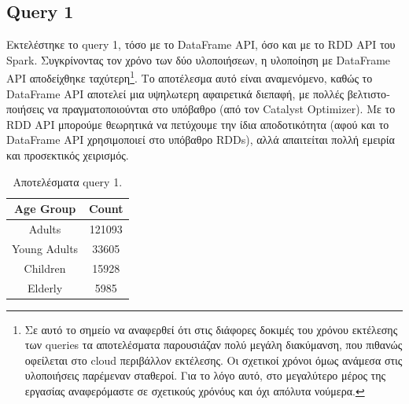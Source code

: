 \documentclass[a4paper,12pt]{article}
\begin{document}
\begin{otherlanguage}{greek}
\section*{Query 1}
	\FloatBarrier
	Εκτελέστηκε το query 1, τόσο με το DataFrame API, όσο και
	με το RDD API του Spark.
	Συγκρίνοντας τον χρόνο των δύο υλοποιήσεων, η υλοποίηση με DataFrame API
	αποδείχθηκε ταχύτερη\footnote{Σε αυτό το σημείο να αναφερθεί
	ότι στις διάφορες δοκιμές του χρόνου
	εκτέλεσης των queries τα αποτελέσματα παρουσιάζαν πολύ μεγάλη διακύμανση, που
	πιθανώς οφείλεται στο cloud περιβάλλον εκτέλεσης. Οι σχετικοί χρόνοι όμως
	ανάμεσα στις υλοποιήσεις παρέμεναν σταθεροί. Για το λόγο αυτό, στο μεγαλύτερο
	μέρος της εργασίας αναφερόμαστε σε σχετικούς χρόνόυς και όχι απόλυτα νούμερα.}.
	Το αποτέλεσμα αυτό είναι αναμενόμενο, καθώς το DataFrame API αποτελεί μια
	υψηλωτερη αφαιρετικά διεπαφή, με πολλές βελτιστοποιήσεις να πραγματοποιούνται
	στο υπόβαθρο (από τον Catalyst Optimizer). Με το RDD API μπορούμε
	θεωρητικά να πετύχουμε την ίδια αποδοτικότητα 
	(αφού και το DataFrame API χρησιμοποιεί στο υπόβαθρο RDDs), 
	αλλά απαιτείται πολλή εμειρία και προσεκτικός χειρισμός.
	\begin{table}[h]
		\centering
		\begin{tabular}{cc}
			Age Group & Count \\
			\hline
			Adults & 121093 \\
			Young Adults & 33605 \\
			Children & 15928 \\
			Elderly & 5985
		\end{tabular}
		\caption{Αποτελέσματα query 1.}
	\end{table}
	\FloatBarrier


\end{otherlanguage}
\end{document}
